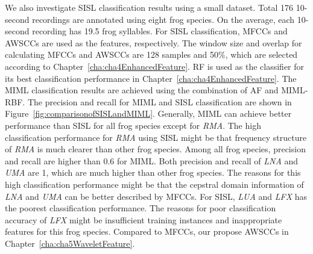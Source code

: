 We also investigate SISL classification results using a small dataset. Total 176 10-second recordings are annotated using eight frog species. On the average, each 10-second recording has 19.5 frog syllables. For SISL classification, MFCCs and AWSCCs are used as the features, respectively. The window size and overlap for calculating MFCCs and AWSCCs are 128 samples and 50\%, which are selected according to Chapter~\ref{cha:cha4EnhancedFeature}. RF is used as the classifier for its best classification performance in Chapter~\ref{cha:cha4EnhancedFeature}. 
The MIML classification results are achieved using the combination of AF and MIML-RBF. The precision and recall for MIML and SISL classification are shown in Figure~\ref{fig:comparisonofSISLandMIML}. Generally, MIML can achieve better performance than SISL for all frog species except for \textit{RMA}. The high classification performance for \textit{RMA} using SISL might be that frequency structure of \textit{RMA} is much clearer than other frog species. Among all frog species, precision and recall are higher than 0.6 for MIML. Both precision and recall of \textit{LNA} and \textit{UMA} are 1, which are much higher than other frog species. The reasons for this high classification performance might be that the cepstral domain information of \textit{LNA} and \textit{UMA} can be better described by MFCCs. For SISL, \textit{LUA} and \textit{LFX} has the poorest classification performance. The reasons for poor classification accuracy of \textit{LFX} might be insufficient training instances and inappropriate features for this frog species. Compared to MFCCs, our propose AWSCCs in Chapter~\ref{cha:cha5WaveletFeature}.


